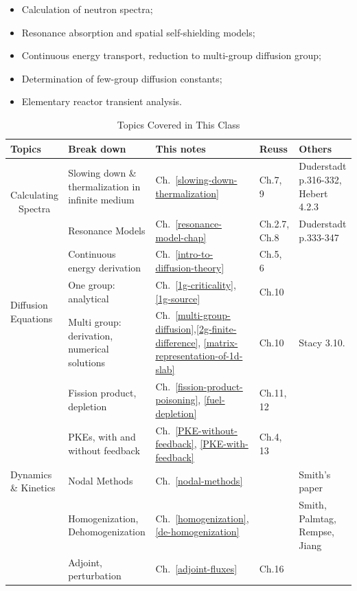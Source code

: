 \documentclass{school-22.211-notes}
\date{February  8, 2012}
\begin{document}
\maketitle

\begin{itemize}
  \item Calculation of neutron spectra;
  \item Resonance absorption and spatial self-shielding models;
  \item Continuous energy transport, reduction to multi-group diffusion group;
  \item Determination of few-group diffusion constants;
  \item Elementary reactor transient analysis.
\end{itemize}

\begin{table}[ht]
  \centering
  \begin{tabular}{|p{1in}|p{2in}|p{0.65in}|p{0.6in}|p{1.5in}|} \hline
    Topics & Break down  & This notes & Reuss & Others \\ \hline
    \multicolumn{1}{|c|}{\multirow{2}{*}{Calculating Spectra}} & Slowing down \& thermalization in infinite medium   & Ch.~\ref{slowing-down-thermalization} & Ch.7, 9  & Duderstadt p.316-332, Hebert 4.2.3 \\ 
    & Resonance Models & Ch.~\ref{resonance-model-chap} & Ch.2.7, Ch.8 & Duderstadt p.333-347 \\ \hline
    \multirow{3}{*}{Diffusion Equations} & Continuous energy derivation & Ch.~\ref{intro-to-diffusion-theory} & Ch.5, 6 & \\ 
    & One group: analytical & Ch.~\ref{1g-criticality}, \ref{1g-source} & Ch.10  &  \\ 
    & Multi group: derivation, numerical solutions & Ch.~\ref{multi-group-diffusion},\ref{2g-finite-difference}, \ref{matrix-representation-of-1d-slab} & Ch.10  &  Stacy 3.10. \\ \hline
   \multirow{5}{*}{Dynamics \& Kinetics} & Fission product, depletion & Ch.~\ref{fission-product-poisoning}, \ref{fuel-depletion} & Ch.11, 12 &  \\
    & PKEs, with and without feedback & Ch.~\ref{PKE-without-feedback}, \ref{PKE-with-feedback}  & Ch.4, 13 & \\
    & Nodal Methods  & Ch.~\ref{nodal-methods}  &  & Smith's paper \\
    & Homogenization, Dehomogenization & Ch.~\ref{homogenization}, \ref{de-homogenization}  &  &Smith, Palmtag, Rempse, Jiang \\
    & Adjoint, perturbation & Ch.~\ref{adjoint-fluxes} & Ch.16 & \\ \hline 
  \end{tabular}
  \caption{Topics Covered in This Class}
\end{table}
\end{document}

